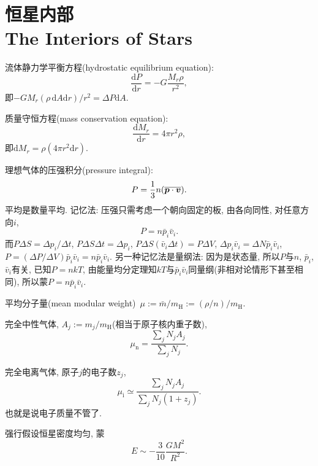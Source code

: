 \chapter{恒星内部\\The Interiors of Stars}

流体静力学平衡方程(hydrostatic equilibrium equation):
\begin{equation*}
    \frac{\mathrm{d} P}{\mathrm{d} r}
    = -G\frac{M_r\rho}{r^2},
\end{equation*}
即$-GM_r(\rho\,\mathrm{d}A\mathrm{d}r)/r^2=\Delta P\mathrm{d}A$.

质量守恒方程(mass conservation equation):
\begin{equation*}
    \frac{\mathrm{d} M_r}{\mathrm{d} r}
    = 4\pi r^2\rho,
\end{equation*}
即$\mathrm{d} M_r=\rho (4\pi r^2\mathrm{d} r)$.

理想气体的压强积分(pressure integral):
\begin{equation*}
    P=\frac{1}{3}n(\overline{\boldsymbol{p}\cdot\boldsymbol{v}}).
\end{equation*}
平均是数量平均. 记忆法: 压强只需考虑一个朝向固定的板, 由各向同性, 对任意方向$i$,
\begin{equation*}
    P=n\bar{p}_i\bar{v}_i.
\end{equation*}
而$P\Delta S = \Delta p_i/\Delta t$, $P\Delta S \Delta t= \Delta p_i$, $P\Delta S (\bar{v}_i\Delta t)= P\Delta V$, $\Delta p_i \bar{v}_i = \Delta N \bar{p}_i\bar{v}_i$, $P=(\Delta P/\Delta V)\bar{p}_i\bar{v}_i=n\bar{p}_i\bar{v}_i$. 另一种记忆法是量纲法: 因为是状态量, 所以$P$与$n$, $\bar{p}_i$, $\bar{v}_i$有关, 已知$P=nkT$, 由能量均分定理知$kT$与$\bar{p}_i\bar{v}_i$同量纲(非相对论情形下甚至相同), 所以蒙$P=n\bar{p}_i\bar{v}_i$.

平均分子量(mean modular weight)~$\mu:=\bar{m}/m_\text{H}:=(\rho/n)/m_\text{H}$.

完全中性气体, $A_j:=m_j/m_\text{H}$(相当于原子核内重子数),
\begin{equation*}
    \mu_\text{n}=\frac{\sum_j N_j A_j}{\sum_j N_j}.
\end{equation*}

完全电离气体, 原子$j$的电子数$z_j$,
\begin{equation*}
    \mu_\text{i}\simeq\frac{\sum_j N_j A_j}{\sum_j N_j(1+z_j)}.
\end{equation*}
也就是说电子质量不管了.

强行假设恒星密度均匀, 蒙
\begin{equation*}
    E\sim-\frac{3}{10}\frac{GM^2}{R^2}.
\end{equation*}

